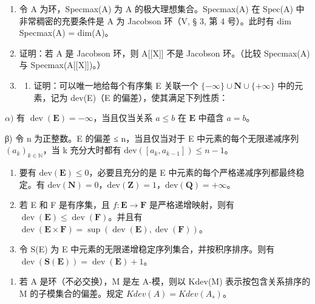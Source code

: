 \begin{enumerate}
\def\labelenumi{\arabic{enumi})}
\setcounter{enumi}{1}
\item
  令 A 为环，Specmax(A) 为 A 的极大理想集合。Specmax(A) 在 Spec(A) 中非常稠密的充要条件是 A 为 Jacobson 环（V, § 3, 第 4 号）。此时有 dim Specmax(A) = dim(A)。
\item
  证明：若 A 是 Jacobson 环，则 A{[}{[}X{]}{]} 不是 Jacobson 环。（比较 Specmax(A) 与 Specmax(A{[}{[}X{]}{]})。）
\item
  \begin{enumerate}
  \def\labelenumii{\alph{enumii})}
  \tightlist
  \item
    证明：可以唯一地给每个有序集 E 关联一个 \(\{-\infty\}\cup\mathbf{N}\cup\{+\infty\}\) 中的元素，记为 dev(E)（E 的偏差），使其满足下列性质：
  \end{enumerate}
\end{enumerate}

\(\alpha)\) 有 \(\operatorname{dev}(\mathbf{E}) = -\infty\)，当且仅当关系 \(a \leqslant b\) 在 \(\mathbf{E}\) 中蕴含 \(a = b\)。

β) 令 n 为正整数。E 的偏差 ≤ n，当且仅当对于 E 中元素的每个无限递减序列 \((a_{k})_{k\in\mathbb{N}}\)，当 k 充分大时都有 \(\text{dev}([a_{k}, a_{k-1}]) \leqslant n - 1\)。

\begin{enumerate}
\def\labelenumi{\alph{enumi})}
\setcounter{enumi}{1}
\item
  要有 \(\text{dev}(\mathbf{E}) \leqslant 0\)，必要且充分的是 E 中元素的每个严格递减序列都最终稳定。有 \(\text{dev}(\mathbf{N}) = 0\)，\(\text{dev}(\mathbf{Z}) = 1\)，\(\text{dev}(\mathbf{Q}) = +\infty\)。
\item
  若 E 和 F 是有序集，且 \(f: \mathbf{E} \to \mathbf{F}\) 是严格递增映射，则有 \(\operatorname{dev}(\mathbf{E}) \leqslant \operatorname{dev}(\mathbf{F})\)。并且有 \(\operatorname{dev}(\mathbf{E} \times \mathbf{F}) = \sup(\operatorname{dev}(\mathbf{E}), \operatorname{dev}(\mathbf{F}))\)。
\item
  令 S(E) 为 E 中元素的无限递增稳定序列集合，并按积序排序。则有 \(\operatorname{dev}(\mathbf{S}(\mathbf{E})) = \operatorname{dev}(\mathbf{E}) + 1\)。
\end{enumerate}

\begin{enumerate}
\def\labelenumi{\arabic{enumi})}
\setcounter{enumi}{4}
\tightlist
\item
  若 A 是环（不必交换），M 是左 A-模，则以 Kdev(M) 表示按包含关系排序的 M 的子模集合的偏差。规定 \(Kdev(A) = Kdev(A_s)\)。
\end{enumerate}

